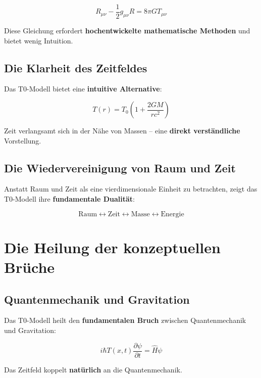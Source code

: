 \documentclass[12pt,a4paper]{report}
\begin{document}
	\begin{equation}
		R_{\mu\nu} - \frac{1}{2}g_{\mu\nu}R = 8\pi G T_{\mu\nu}
	\end{equation}
	
	Diese Gleichung erfordert \textbf{hochentwickelte mathematische Methoden} und bietet wenig Intuition.
	
	\subsection{Die Klarheit des Zeitfeldes}
	
	Das T0-Modell bietet eine \textbf{intuitive Alternative}:
	
	\begin{equation}
		T(r) = T_0\left(1 + \frac{2GM}{rc^2}\right)
	\end{equation}
	
	Zeit verlangsamt sich in der Nähe von Massen -- eine \textbf{direkt verständliche} Vorstellung.
	
	\subsection{Die Wiedervereinigung von Raum und Zeit}
	
	Anstatt Raum und Zeit als eine vierdimensionale Einheit zu betrachten, zeigt das T0-Modell ihre \textbf{fundamentale Dualität}:
	
	\begin{equation}
		\text{Raum} \leftrightarrow \text{Zeit} \leftrightarrow \text{Masse} \leftrightarrow \text{Energie}
	\end{equation}
	
	\section{Die Heilung der konzeptuellen Brüche}
	
	\subsection{Quantenmechanik und Gravitation}
	
	Das T0-Modell heilt den \textbf{fundamentalen Bruch} zwischen Quantenmechanik und Gravitation:
	
	\begin{equation}
		i\hbar T(x,t)\frac{\partial\psi}{\partial t} = \hat{H}\psi
	\end{equation}
	
	Das Zeitfeld koppelt \textbf{natürlich} an die Quantenmechanik.
	
\end{document}

